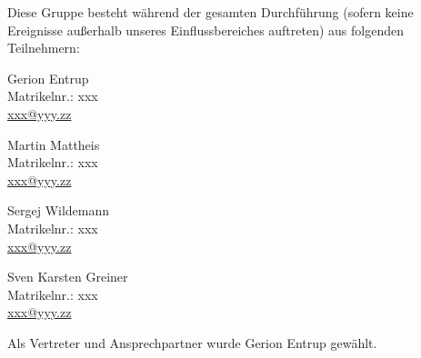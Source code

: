 Diese Gruppe besteht während der gesamten Durchführung (sofern keine Ereignisse außerhalb unseres Einflussbereiches auftreten)  aus folgenden Teilnehmern:

\begin{multicols}{2}
    \parbox{\textwidth}{
        Gerion Entrup\\
        Matrikelnr.: xxx\\
        \href{mailto://xxx@yyy.zz}{xxx@yyy.zz}
    }

    \parbox{\textwidth}{
        Martin Mattheis\\
        Matrikelnr.: xxx\\
        \href{mailto://xxx@yyy.zz}{xxx@yyy.zz}
    }

    \parbox{\textwidth}{
        Sergej Wildemann\\
        Matrikelnr.: xxx\\
        \href{mailto://xxx@yyy.zz}{xxx@yyy.zz}
    }

    \parbox{\textwidth}{
        Sven Karsten Greiner\\
        Matrikelnr.: xxx\\
        \href{mailto://xxx@yyy.zz}{xxx@yyy.zz}
    }
\end{multicols}

Als Vertreter und Ansprechpartner wurde Gerion Entrup gewählt.

